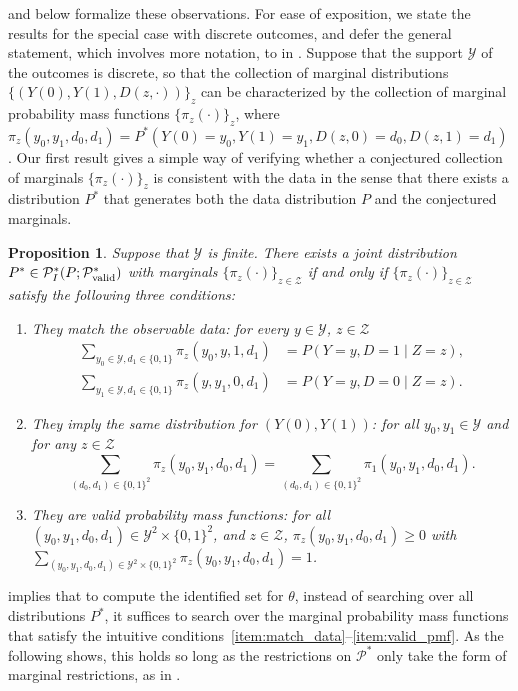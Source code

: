 \documentclass[12pt]{article}%
\newtheorem{prop}{Proposition}
\theoremstyle{definition}
\newcommand\1{\operatorname{I}\indicatorfence}
\begin{document}
 and  below formalize these
observations. For ease of exposition, we state the results for the special case
with discrete outcomes, and defer the general statement, which involves more
notation, to  in . Suppose that the support $\mathcal{Y}$ of the outcomes is
discrete, so that the collection of marginal distributions
$\{(Y(0), Y(1), D(z, \cdot)) \}_{z}$ can be characterized by the collection of
marginal probability mass functions $\{\pi_{z}(\cdot) \}_{z}$, where
$\pi_{z}(y_{0}, y_{1}, d_{0}, d_{1})=P^{*}(Y(0)=y_{0}, Y(1)=y_{1}, D(z,0)=d_{0},
D(z,1)=d_{1})$. Our first result gives a simple way of verifying whether a
conjectured collection of marginals $\{\pi_{z}(\cdot)\}_{z}$ is consistent
with the data in the sense that there exists a distribution $P^{*}$ that
generates both the data distribution $P$ and the conjectured marginals.

\begin{prop}\label{prop:marginals_one_z}
  Suppose that $\mathcal{Y}$ is finite. There exists a joint
  distribution
  $P^* \in \mathcal{P}^*_{I}(P;\mathcal{P}^{*}_{\textnormal{valid}})$ with marginals $\{\pi_{z}(\cdot) \}_{z \in \mathcal{Z}}$ if and only if $\{\pi_{z}(\cdot) \}_{z \in \mathcal{Z}}$ satisfy the following three conditions:
\begin{enumerate}
\item\label{item:match_data} They match the observable data: for every $y \in \mathcal{Y}$,
  $z \in \mathcal{Z}$
    \begin{align*}
      \sum_{y_0 \in \mathcal{Y}, d_1 \in \{0,1\}} \pi_z
      (y_0, y, 1, d_1)&=P(Y=y, D=1 \mid Z=z), \\
      \sum_{y_1 \in \mathcal{Y}, d_1 \in \{0,1\}}
      \pi_z(y, y_1, 0, d_1)&=P(Y=y, D=0 \mid Z=z).
\end{align*}
\item\label{item:same_marginals} They imply the same distribution for
  $(Y(0), Y(1))$: for all $y_0,y_1 \in \mathcal{Y}$ and for any
  $z \in \mathcal{Z}$
  \begin{equation*}
    \sum_{(d_0, d_1) \in \{0,1\}^2} \pi_{z}(y_0, y_1, d_0, d_1) = \sum_{(d_0, d_1) \in \{0,1\}^2} \pi_{1}(y_0, y_1, d_0, d_1).
  \end{equation*}
\item\label{item:valid_pmf} They are valid probability mass functions: for all
  $(y_0, y_1, d_0, d_1) \in \mathcal{Y}^2 \times \{0,1\}^2$, and
  $z \in \mathcal{Z}$, $ \pi_z(y_0, y_1, d_0, d_1) \geq 0$ with
  $\sum_{(y_0, y_1, d_0, d_1) \in \mathcal{Y}^2 \times \{0,1\}^2} \pi_z(y_0, y_1, d_0, d_1) = 1$.
\end{enumerate}
\end{prop}
 implies that to compute the identified set for
$\theta$, instead of searching over all distributions $P^{*}$, it suffices to
search over the marginal probability mass functions that satisfy the intuitive
conditions~\ref{item:match_data}--\ref{item:valid_pmf}. As the following
 shows, this holds so long as the restrictions on
$\mathcal{P}^{*}$ only take the form of marginal restrictions, as in
.
\end{document}
